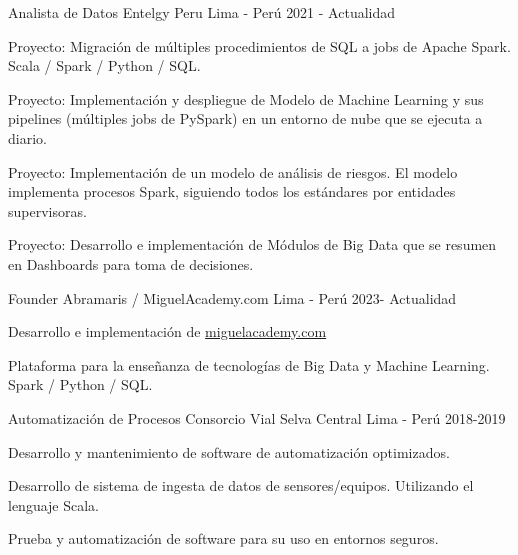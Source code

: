 

\begin{cventries}

  \cventry
  {Analista de Datos} %
  {Entelgy Peru} %
  {Lima - Per\'u} %
  {2021 - Actualidad} %
  {
    \begin{cvitems} %
      \item {Proyecto: Migraci\'on de m\'ultiples procedimientos de SQL a jobs de Apache Spark. Scala / Spark / Python / SQL.}
      \item {Proyecto: Implementaci\'on y despliegue de Modelo de Machine Learning y sus pipelines (m\'ultiples jobs de PySpark) en un entorno de nube que se ejecuta a diario.}
      \item {Proyecto: Implementaci\'on de un modelo de an\'alisis de riesgos. El modelo implementa procesos Spark, siguiendo todos los est\'andares por entidades supervisoras.}
      \item {Proyecto: Desarrollo e implementaci\'on de M\'odulos de Big Data que se resumen en Dashboards para toma de decisiones.}
    \end{cvitems}
  }

  \cventry
  {Founder} %
  {Abramaris / MiguelAcademy.com} %
  {Lima - Per\'u} %
  {2023- Actualidad} %
  {
    \begin{cvitems} %
      \item {Desarrollo e implementaci\'on de \href{www.miguelacademy.com}{miguelacademy.com}}
      \item {Plataforma para la enseñanza de tecnolog\'ias de Big Data y Machine Learning. Spark / Python / SQL.}
    \end{cvitems}
  }
  \cventry
  {Automatizaci\'on de Procesos} %
  {Consorcio Vial Selva Central} %
  {Lima - Per\'u} %
  {2018-2019} %
  {
    \begin{cvitems} %
      \item {Desarrollo y mantenimiento de software de automatizaci\'on optimizados.}
      \item {Desarrollo de sistema de ingesta de datos de sensores/equipos. Utilizando el lenguaje Scala.}
      \item {Prueba y automatizaci\'on de software para su uso en entornos seguros.}
    \end{cvitems}
  }


\end{cventries}
